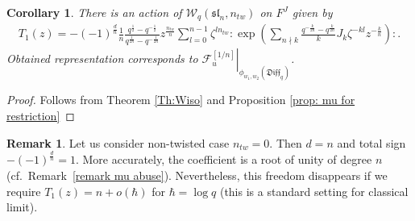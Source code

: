 \documentclass[pdftex]{sigma}
\numberwithin{equation}{section}
\newtheorem{Corollary}[Theorem]{Corollary}
\theoremstyle{definition}
\newtheorem{Remark}[Theorem]{Remark}
\newcommand{\half}{\frac{1}{2}}
\newcommand{\qD}{\mathfrak{Diff}_q}
\newcommand{ \twW }{ \mathcal{W}_{q} ( \mathfrak{sl}_n, n_{tw} ) }
\begin{document}
\begin{Corollary}
There is an action of $\twW$ on $F^{J}$ given by
\begin{gather*}
T_1 (z) = -(-1)^{\frac{d}{n}} \frac{1}{n} \frac{q^{\half}-q^{-\half}}{q^{ \frac{1}{2n}} - q^{-\frac{1}{2n}}} z^{\frac{n_{tw}}{n}} \sum_{l=0}^{n-1} \zeta^{l n_{tw}} : \! \exp \left( \sum_{n \nmid k} \frac{q^{-\frac{k}{2n}}-q^{\frac{k}{2n}}}{k} J_k \zeta^{-kl} z^{-\frac{k}{n}} \right) \! \!:.
\end{gather*}
Obtained representation corresponds to $\left. \mathcal{F}^{[1/n]}_{u} \right|_{\phi_{w_1,w_2}(\qD)}$.
\end{Corollary}
\begin{proof}
Follows from Theorem \ref{Th:Wiso} and Proposition \ref{prop: mu for restriction}
\end{proof}
\begin{Remark}
Let us consider non-twisted case $n_{tw}=0$. Then $d=n$ and total sign $-(-1)^{\frac{d}{n}}=1$. More accurately, the coefficient is a root of unity of degree $n$ (cf.\ Remark~\ref{remark mu abuse}). Nevertheless, this freedom disappears if we require $T_1(z) = n + o(\hbar)$ for $\hbar = \log q $ (this is a standard setting for classical limit).
\end{Remark}
\end{document}
